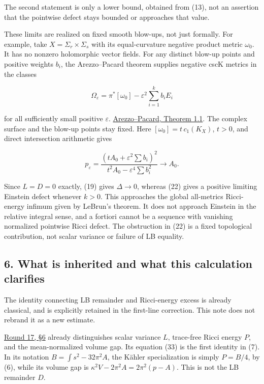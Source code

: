 \documentclass[
  11pt,
]{article}
\begin{document}
The second statement is only a lower bound, obtained from (13), not an
assertion that the pointwise defect stays bounded or approaches that
value.

These limits are realized on fixed smooth blow-ups, not just formally.
For example, take \(X=\Sigma_r\times\Sigma_s\) with its equal-curvature
negative product metric \(\omega_0\). It has no nonzero holomorphic
vector fields. For any distinct blow-up points and positive weights
\(b_i\), the Arezzo--Pacard theorem supplies negative cscK metrics in
the classes

\[
 \Omega_\varepsilon=\pi^*[\omega_0]-\varepsilon^2\sum_{i=1}^k b_i E_i
\]

for all sufficiently small positive \(\varepsilon\).
\href{https://perso.pages.math.cnrs.fr/users/frank.pacard/Publications/43.pdf}{Arezzo--Pacard,
Theorem 1.1}. The complex surface and the blow-up points stay fixed.
Here \([\omega_0]=t\,c_1(K_X)\), \(t>0\), and direct intersection
arithmetic gives

\[
 p_\varepsilon=
 \frac{(t A_0+\varepsilon^2\sum b_i)^2}
 {t^2 A_0-\varepsilon^4\sum b_i^2}\longrightarrow A_0.
 \tag{23}
\]

Since \(L=D=0\) exactly, (19) gives \(\Delta\to0\), whereas (22) gives a
positive limiting Einstein defect whenever \(k>0\). This approaches the
global all-metrics Ricci-energy infimum given by LeBrun's theorem. It
does not approach Einstein in the relative integral sense, and a
fortiori cannot be a sequence with vanishing normalized pointwise Ricci
defect. The obstruction in (22) is a fixed topological contribution, not
scalar variance or failure of LB equality.

\hypertarget{what-is-inherited-and-what-this-calculation-clarifies}{%
\subsection{6. What is inherited and what this calculation
clarifies}\label{what-is-inherited-and-what-this-calculation-clarifies}}

The identity connecting LB remainder and Ricci-energy excess is already
classical, and is explicitly retained in the first-line correction. This
note does not rebrand it as a new estimate.

\href{round17_integral.md}{Round 17, §6} already distinguishes scalar
variance \(L\), trace-free Ricci energy \(P\), and the mean-normalized
volume gap. Its equation (33) is the first identity in (7). In its
notation \(B=\int s^2-32\pi^2 A\), the Kähler specialization is simply
\(P=B/4\), by (6), while its volume gap is
\(\kappa^2V-2\pi^2 A=2\pi^2(p-A)\). This is not the LB remainder \(D\).
\end{document}
